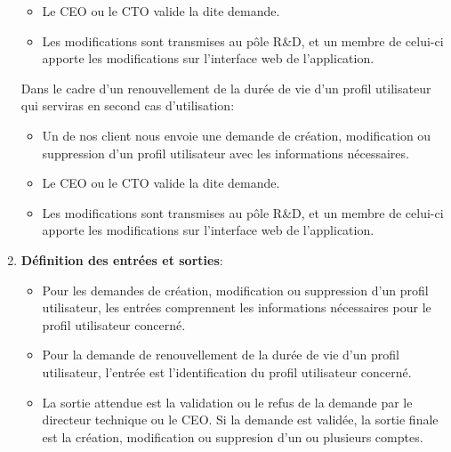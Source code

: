 \documentclass[a4paper, 11pt]{report}
\begin{document}
\begin{enumerate}
\begin{itemize}
      \item Le CEO ou le CTO valide la dite demande.
      \item Les modifications sont transmises au pôle R&D, et un membre de celui-ci apporte les modifications sur l'interface web de l'application.
    \end{itemize}
    Dans le cadre d'un renouvellement de la durée de vie d'un profil utilisateur qui serviras en second cas d'utilisation:
    \begin{itemize}
      \item Un de nos client nous envoie une demande de création, modification ou suppression d'un profil utilisateur avec les informations nécessaires.
      \item Le CEO ou le CTO valide la dite demande.
      \item Les modifications sont transmises au pôle R&D, et un membre de celui-ci apporte les modifications sur l'interface web de l'application.
    \end{itemize}
  \item \textbf{Définition des entrées et sorties}:
    \begin{itemize}
      \item Pour les demandes de création, modification ou suppression d'un profil utilisateur, les entrées comprennent les informations nécessaires pour le profil utilisateur concerné.
      \item Pour la demande de renouvellement de la durée de vie d'un profil utilisateur, l'entrée est l'identification du profil utilisateur concerné.
      \item La sortie attendue est la validation ou le refus de la demande par le directeur technique ou le CEO. Si la demande est validée, la sortie finale est la création, modification ou suppresion d'un ou plusieurs comptes.
    \end{itemize}
\end{enumerate}
\end{document}
